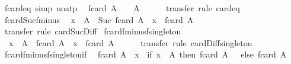 \begin{isabellebody}
%
\endisadelimproof
\isanewline
{}\isamarkupfalse%
\ fcard{\isacharunderscore}{}{\isacharunderscore}eq\ {\isacharbrackleft}simp{\isacharcomma}\ no{\isacharunderscore}atp{\isacharbrackright}{\isacharcolon}\isanewline
\ \ {\isachardoublequoteopen}fcard\ A\ {\isacharequal}\ {}\ {\isasymlongleftrightarrow}\ A\ {\isacharequal}\ {\isacharbraceleft}{\isacharbar}{\isacharbar}{\isacharbraceright}{\isachardoublequoteclose}\isanewline
%
\isadelimproof
\ \ %
\endisadelimproof
%
\isatagproof
{}\isamarkupfalse%
\ transfer\ {\isacharparenleft}rule\ card{\isacharunderscore}{}{\isacharunderscore}eq{\isacharparenright}%
\endisatagproof
{\isafoldproof}%
%
\isadelimproof
\isanewline
%
\endisadelimproof
\isanewline
{}\isamarkupfalse%
\ fcard{\isacharunderscore}Suc{\isacharunderscore}fminus{}{\isacharcolon}\isanewline
\ \ {\isachardoublequoteopen}x\ {\isacharbar}{\isasymin}{\isacharbar}\ A\ {\isasymLongrightarrow}\ Suc\ {\isacharparenleft}fcard\ {\isacharparenleft}A\ {\isacharbar}{\isacharminus}{\isacharbar}\ {\isacharbraceleft}{\isacharbar}x{\isacharbar}{\isacharbraceright}{\isacharparenright}{\isacharparenright}\ {\isacharequal}\ fcard\ A{\isachardoublequoteclose}\isanewline
%
\isadelimproof
\ \ %
\endisadelimproof
%
\isatagproof
{}\isamarkupfalse%
\ transfer\ {\isacharparenleft}rule\ card{\isacharunderscore}Suc{\isacharunderscore}Diff{}{\isacharparenright}%
\endisatagproof
{\isafoldproof}%
%
\isadelimproof
\isanewline
%
\endisadelimproof
\isanewline
{}\isamarkupfalse%
\ fcard{\isacharunderscore}fminus{\isacharunderscore}fsingleton{\isacharcolon}\isanewline
\ \ {\isachardoublequoteopen}x\ {\isacharbar}{\isasymin}{\isacharbar}\ A\ {\isasymLongrightarrow}\ fcard\ {\isacharparenleft}A\ {\isacharbar}{\isacharminus}{\isacharbar}\ {\isacharbraceleft}{\isacharbar}x{\isacharbar}{\isacharbraceright}{\isacharparenright}\ {\isacharequal}\ fcard\ A\ {\isacharminus}\ {}{\isachardoublequoteclose}\isanewline
%
\isadelimproof
\ \ %
\endisadelimproof
%
\isatagproof
{}\isamarkupfalse%
\ transfer\ {\isacharparenleft}rule\ card{\isacharunderscore}Diff{\isacharunderscore}singleton{\isacharparenright}%
\endisatagproof
{\isafoldproof}%
%
\isadelimproof
\isanewline
%
\endisadelimproof
\isanewline
{}\isamarkupfalse%
\ fcard{\isacharunderscore}fminus{\isacharunderscore}fsingleton{\isacharunderscore}if{\isacharcolon}\isanewline
\ \ {\isachardoublequoteopen}fcard\ {\isacharparenleft}A\ {\isacharbar}{\isacharminus}{\isacharbar}\ {\isacharbraceleft}{\isacharbar}x{\isacharbar}{\isacharbraceright}{\isacharparenright}\ {\isacharequal}\ {\isacharparenleft}if\ x\ {\isacharbar}{\isasymin}{\isacharbar}\ A\ then\ fcard\ A\ {\isacharminus}\ {}\ else\ fcard\ A{\isacharparenright}{\isachardoublequoteclose}\isanewline

\end{isabellebody}
